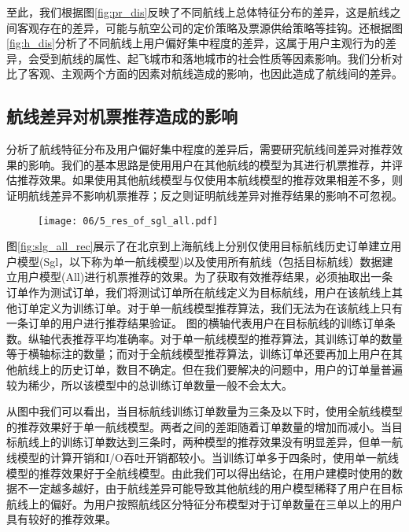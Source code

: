 至此，我们根据图\ref{fig:pr_dis}反映了不同航线上总体特征分布的差异，这是航线之间客观存在的差异，可能与航空公司的定价策略及票源供给策略等挂钩。还根据图\ref{fig:h_dis}分析了不同航线上用户偏好集中程度的差异，这属于用户主观行为的差异，会受到航线的属性、起飞城市和落地城市的社会性质等因素影响。我们分析对比了客观、主观两个方面的因素对航线造成的影响，也因此造成了航线间的差异。

\subsection{航线差异对机票推荐造成的影响}

分析了航线特征分布及用户偏好集中程度的差异后，需要研究航线间差异对推荐效果的影响。我们的基本思路是使用用户在其他航线的模型为其进行机票推荐，并评估推荐效果。如果使用其他航线模型与仅使用本航线模型的推荐效果相差不多，则证明航线差异不影响机票推荐；反之则证明航线差异对推荐结果的影响不可忽视。

\begin{figure}
 \centering
 \texttt{[image: 06/5\_res\_of\_sgl\_all.pdf]}
\end{figure}

图\ref{fig:slg_all_rec}展示了在北京到上海航线上分别仅使用目标航线历史订单建立用户模型(Sgl，以下称为单一航线模型)以及使用所有航线（包括目标航线）数据建立用户模型(All)进行机票推荐的效果。为了获取有效推荐结果，必须抽取出一条订单作为测试订单，我们将测试订单所在航线定义为目标航线，用户在该航线上其他订单定义为训练订单。对于单一航线模型推荐算法，我们无法为在该航线上只有一条订单的用户进行推荐结果验证。
图的横轴代表用户在目标航线的训练订单条数。纵轴代表推荐平均准确率。对于单一航线模型的推荐算法，其训练订单的数量等于横轴标注的数量；而对于全航线模型推荐算法，训练订单还要再加上用户在其他航线上的历史订单，数目不确定。但在我们要解决的问题中，用户的订单量普遍较为稀少，所以该模型中的总训练订单数量一般不会太大。

从图中我们可以看出，当目标航线训练订单数量为三条及以下时，使用全航线模型的推荐效果好于单一航线模型。两者之间的差距随着订单数量的增加而减小。当目标航线上的训练订单数达到三条时，两种模型的推荐效果没有明显差异，但单一航线模型的计算开销和I/O吞吐开销都较小。当训练订单多于四条时，使用单一航线模型的推荐效果好于全航线模型。由此我们可以得出结论，在用户建模时使用的数据不一定越多越好，由于航线差异可能导致其他航线的用户模型稀释了用户在目标航线上的偏好。为用户按照航线区分特征分布模型对于订单数量在三单以上的用户具有较好的推荐效果。

